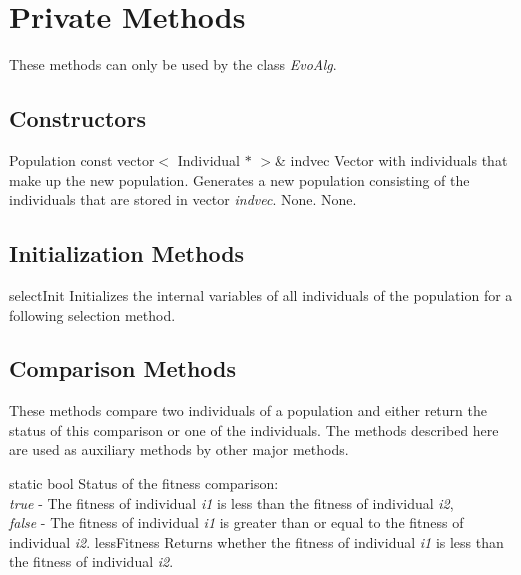 \section{Private Methods}

These methods can only be used by the class {\em EvoAlg}.

\subsection{Constructors}

\setNormalInstance
\printMethodWithOneParam
{}
{Population}
{const vector$<$ Individual $\ast$ $>$\&}
{indvec}
{Vector with individuals that make up the new population.}
{Generates a new population consisting of the individuals that are
 stored in vector {\em indvec}.}
{None.}
{None.}

\subsection{Initialization Methods}

\setNormalInstance
\printEmptyMethod
{selectInit}
{Initializes the internal variables of all individuals of the population
 for a following selection method.}

\clearpage

\subsection{Comparison Methods}

These methods compare two individuals of a population 
and either return the status of this comparison or 
one of the individuals. The methods described here are used as 
auxiliary methods by other major methods.

\vspace{2ex}

\setNormalInstance
\setCorrectWidthThree{8pt}
\printMethodWithParamsSaved
{static bool}
{Status of the fitness comparison:\\
 {\em true} - The fitness of individual {\em i1} is less than the fitness
 of individual {\em i2},\\
 {\em false} - The fitness of individual {\em i1} is greater than or equal
 to the fitness of individual {\em i2}.}
{lessFitness}
{Returns whether the fitness of individual {\em i1} is less than the 
 fitness of individual {\em i2}.}
{}
\setCorrectWidthThree{4pt}

